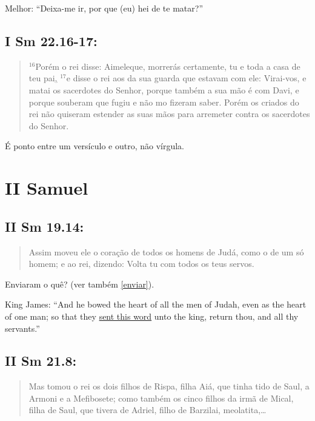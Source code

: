 Melhor: ``Deixa-me ir, por que (eu) hei de te matar?''

\subsection*{I Sm 22.16-17:} 
\begin{quote}
    \small
$^{\mathrm{16}}$Porém o rei disse: Aimeleque, morrerás certamente, tu e toda a casa de teu pai\uline{,} $^{\mathrm{17}}$e disse o rei aos da sua guarda que estavam com ele: Virai-vos, e matai os sacerdotes do Senhor, porque também a sua mão é com Davi, e porque souberam que fugiu e não mo fizeram saber. Porém os criados do rei não quiseram estender as suas mãos para arremeter contra os sacerdotes do Senhor.
\end{quote}

É ponto entre um versículo e outro, não vírgula.

\section{II Samuel}
\subsection*{II Sm 19.14:} 
\begin{quote}
    \small
Assim moveu ele o coração de todos os homens de Judá, como o de um só homem; e  ao rei, dizendo: Volta tu com todos os teus servos.
\end{quote}

Enviaram o quê? (ver também \ref{enviar}).

King James: ``And he bowed the heart of all the men of Judah, even as the heart of one man; so that they \uline{sent this word} unto the king, return thou, and all thy servants.''

\subsection*{II Sm 21.8:} 
\begin{quote}
    \small
Mas tomou o rei os dois filhos de Rispa, filha  Aiá, que tinha tido de Saul, a Armoni e a Mefibosete; como também os cinco filhos da irmã de Mical, filha de Saul, que tivera de Adriel, filho de Barzilai, meolatita,\ldots
\end{quote}


